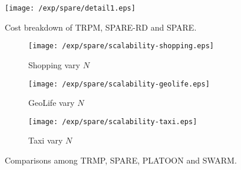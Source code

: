 
\begin{figure*}
\begin{minipage}{0.3\textwidth}
\texttt{[image: /exp/spare/detail1.eps]}
 \caption{Cost breakdown of TRPM, SPARE-RD and SPARE.}
    \label{exp:wl}
\end{minipage}
\begin{minipage}{0.7\textwidth}
\centering
	 \begin{subfigure}[b]{0.32\textwidth}
        \texttt{[image: /exp/spare/scalability-shopping.eps]}
        \caption{Shopping vary $N$}
    \end{subfigure} 
    \begin{subfigure}[b]{0.32\textwidth}
        \texttt{[image: /exp/spare/scalability-geolife.eps]}
        \caption{GeoLife vary $N$}
    \end{subfigure} 
    \begin{subfigure}[b]{0.32\textwidth}
        \texttt{[image: /exp/spare/scalability-taxi.eps]}
        \caption{Taxi vary $N$}
    \end{subfigure} 
 \caption{Comparisons among TRMP, SPARE, PLATOON and SWARM.}
 \label{exp:scalability}
\end{minipage}
\end{figure*}


